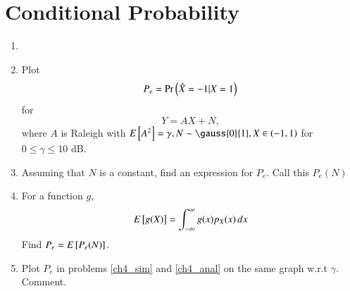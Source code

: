 \documentclass[journal,12pt,twocolumn]{IEEEtran}
\renewcommand\thesection{\arabic{section}}
\begin{document}
\section{Conditional Probability}
\begin{enumerate}[label=\thesection.\arabic*
,ref=\thesection.\theenumi]
\item
\item
\label{ch4_sim}
Plot 
\begin{equation}
P_e = \Pr\left(\hat{X} = -1|X=1\right)
\end{equation}
%
for 
\begin{equation}
Y = AX+N,
\end{equation}
where $A$ is Raleigh with $E\sbrak{A^2} = \gamma, N \sim \gauss{0}{1}, X \in \brak{-1,1}$ for $0 \le \gamma \le 10$ dB.
%
\item
Assuming that $N$ is a constant, find an expression for $P_e$.  Call this $P_e(N)$
%
\item
%
\label{ch4_anal}
For a function $g$,
\begin{equation}
E{}\left[g(X)\right] = \int_{-\infty}^{\infty}g(x)p_{X}(x)\, dx
\end{equation}
%
Find $P_e = E{}\left[P_e(N)\right]$.
%
\item
Plot $P_e$ in problems \ref{ch4_sim} and \ref{ch4_anal} on the same graph w.r.t $\gamma$.  Comment.
		\end{enumerate}
\end{document}
